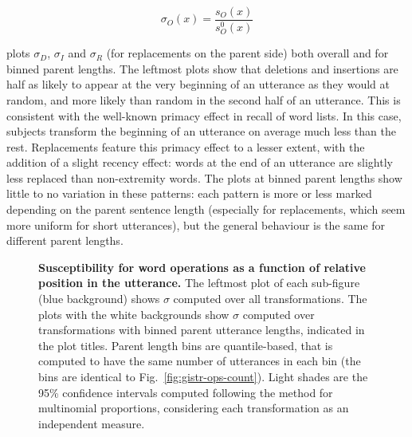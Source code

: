 \[\sigma_O(x) = \frac{s_O(x)}{s_O^0(x)}\]

 plots \(\sigma_D\), \(\sigma_I\) and
\(\sigma_R\) (for replacements on the parent side) both overall and for
binned parent lengths. The leftmost plots show that deletions and
insertions are half as likely to appear at the very beginning of an
utterance as they would at random, and more likely than random in the
second half of an utterance. This is consistent with the well-known
primacy effect in recall of word lists. In this case, subjects transform
the beginning of an utterance on average much less than the rest.
Replacements feature this primacy effect to a lesser extent, with the
addition of a slight recency effect: words at the end of an utterance
are slightly less replaced than non-extremity words. The plots at binned
parent lengths show little to no variation in these patterns: each
pattern is more or less marked depending on the parent sentence length
(especially for replacements, which seem more uniform for short
utterances), but the general behaviour is the same for different parent
lengths.

\begin{figure}[!ht]
  \centering


  \caption[Susceptibility for word operations as a function of relative position in the utterance]{
  \textbf{Susceptibility for word operations as a function of relative position in the utterance.}
  The leftmost plot of each sub-figure (blue background) shows $\sigma$ computed over all transformations.
  The plots with the white backgrounds show $\sigma$ computed over transformations with binned parent utterance lengths, indicated in the plot titles.
  Parent length bins are quantile-based, that is computed to have the same number of utterances in each bin (the bins are identical to Fig.~\ref{fig:gistr-ops-count}).
  Light shades are the 95\% confidence intervals computed following the \textcite{goodman_simultaneous_1965} method for multinomial proportions, considering each transformation as an independent measure.
  }
  \label{fig:gistr-susc-ops}
\end{figure}

